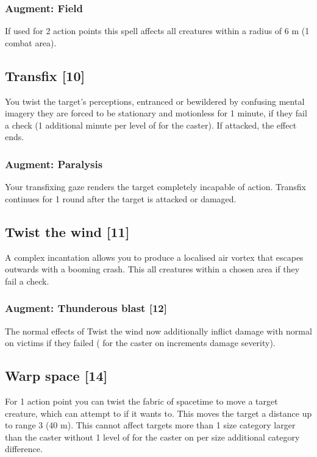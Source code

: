 \subsubsection{Augment: Field}
If used for 2 action points this spell affects all creatures within a radius of 6 m (1 combat area).

\subsection{Transfix [10]}
\label{spell:transfix}
You twist the target's perceptions, entranced or bewildered by confusing mental imagery they are forced to be stationary and motionless for 1 minute, if they fail a  check (1 additional minute per level of  for the caster). If attacked, the effect ends. 
\subsubsection{Augment: Paralysis}
Your transfixing gaze renders the target completely incapable of action. Transfix continues for 1 round after the target is attacked or damaged.

\subsection{Twist the wind [11]}
A complex incantation allows you to produce a localised air vortex that escapes outwards with a booming crash. This  all creatures within a chosen area if they fail a  check.
\subsubsection{Augment: Thunderous blast [12]}
The normal effects of Twist the wind now additionally inflict damage with normal  on victims if they failed  ( for the caster on  increments damage severity).



\subsection{Warp space [14]}
For 1 action point you can twist the fabric of spacetime to move a target creature, which can attempt to  if it wants to. This moves the target a distance up to range 3 (40 m). This cannot affect targets more than 1 size category larger than the caster without 1 level of  for the caster on  per size additional category difference.


